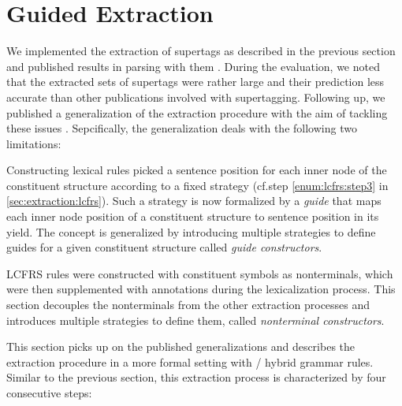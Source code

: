 \documentclass[../../document.tex]{subfiles}
\begin{document}
    \section{Guided Extraction} \label{sec:extraction:guided}
    We implemented the extraction of  supertags as described in the previous section and published results in parsing with them \citep{RupMoe21}.
    During the evaluation, we noted that the extracted sets of supertags were rather large and their prediction less accurate than other publications involved with supertagging.
    Following up, we published a generalization of the extraction procedure with the aim of tackling these issues \citep{Rup22}.
    Sepcifically, the generalization deals with the following two limitations:
    \begin{compactitem}
        \item
            Constructing lexical  rules picked a sentence position for each inner node of the constituent structure according to a fixed strategy (cf.\@ step \ref{enum:lcfrs:step3} in \cref{sec:extraction:lcfrs}).
            Such a strategy is now formalized by a \emph{guide} that maps each inner node position of a constituent structure to sentence position in its yield.
            The concept is generalized by introducing multiple strategies to define guides for a given constituent structure called \emph{guide constructors}.
        \item
            LCFRS rules were constructed with constituent symbols as nonterminals, which were then supplemented with annotations during the lexicalization process.
            This section decouples the nonterminals from the other extraction processes and introduces multiple strategies to define them, called \emph{nonterminal constructors}.
    \end{compactitem}
    This section picks up on the published generalizations and describes the extraction procedure in a more formal setting with / hybrid grammar rules.
    Similar to the previous section, this extraction process is characterized by four consecutive steps:
\end{document}
